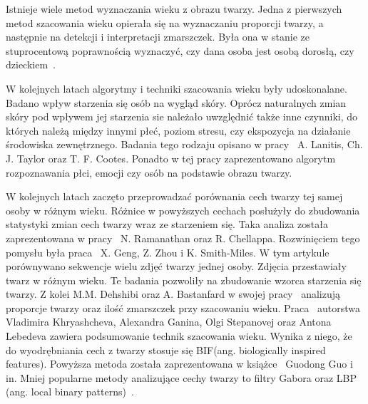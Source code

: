 \documentclass[a4paper,twoside,12pt]{book}
\begin{document}
    Istnieje wiele metod wyznaczania wieku z obrazu twarzy.
    Jedna z pierwszych metod szacowania wieku opierała się na wyznaczaniu proporcji twarzy, a następnie na detekcji i
    interpretacji zmarszczek.
    Była ona w stanie ze stuprocentową poprawnością wyznaczyć, czy dana osoba jest osobą
    dorosłą, czy
    dzieckiem~\cite{kwonLobo}.

    W kolejnych latach algorytmy i techniki szacowania wieku były udoskonalane.
    Badano wpływ starzenia się osób na
    wygląd skóry.
    Oprócz naturalnych
    zmian skóry pod wpływem jej starzenia sie należało uwzględnić także inne
    czynniki, do których należą między innymi
    płeć, poziom stresu, czy ekspozycja na działanie środowiska zewnętrznego.
    Badania tego rodzaju opisano w pracy~\cite{lanitisTaylor} A. Lanitis, Ch. J. Taylor oraz T. F. Cootes.
    Ponadto w tej pracy zaprezentowano algorytm rozpoznawania płci, emocji czy osób na podstawie obrazu twarzy.

    W kolejnych latach zaczęto przeprowadzać porównania cech twarzy tej samej osoby w różnym wieku.
    Różnice w powyższych cechach posłużyły do zbudowania statystyki zmian cech twarzy wraz ze starzeniem się.
    Taka analiza została zaprezentowana w pracy~\cite{ramanthanChelappa} N. Ramanathan oraz R. Chellappa.
    Rozwinięciem tego pomysłu była praca~\cite{gengZhou} X. Geng, Z. Zhou i K. Smith-Miles.
    W tym artykule porównywano sekwencje wielu zdjęć twarzy jednej osoby.
    Zdjęcia przestawiały twarz w różnym wieku.
    Te badania pozwoliły na zbudowanie wzorca starzenia się twarzy.
    Z kolei M.M. Dehshibi oraz A. Bastanfard w swojej pracy~\cite{dehshibiBastard} analizują proporcje twarzy oraz ilość
    zmarszczek przy szacowaniu wieku.
    Praca~\cite{khryashchevGanin} autorstwa
    Vladimira Khryashcheva, Alexandra Ganina, Olgi Stepanovej oraz
    Antona Lebedeva zawiera podsumowanie technik szacowania wieku.
    Wynika z niego, że do wyodrębniania cech z twarzy stosuje się BIF(ang. biologically inspired features).
    Powyższa metoda została zaprezentowana w książce~\cite{bif} Guodong Guo i in.
    Mniej popularne metody analizujące cechy twarzy to filtry Gabora oraz LBP (ang. local binary patterns)~\cite{lbp}.
\end{document}
